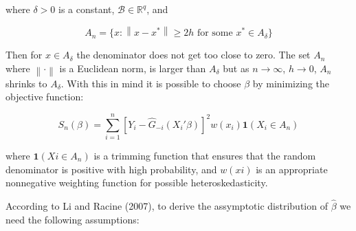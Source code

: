 \documentclass[a4paper]{article}
\newcommand{\norm}[1]{\left\lVert#1\right\rVert}
\begin{document}
where $\delta > 0$ is a constant, $\mathcal{B} \in \mathbb{R}^q$, and

\[ A_n = \{ x : \norm{x - x^*} \geq 2h \text{ for some } x^* \in A_\delta \}
\]

Then for $x \in A_\delta$ the denominator does not get too close to zero. The set $A_n$ where $\norm{\cdot}$ is a Euclidean norm, is larger than $A_\delta$ but as $ n \rightarrow \infty $, $h \rightarrow 0$, $A_n$ shrinks to $A_\delta$. With this in mind it is possible to choose $\beta$ by minimizing the objective function:

\begin{equation}
S_n(\beta) = \sum_{i=1}^{n}  [Y_i - \hat{G}_{-i}(X_i'\beta)]^2w(x_i)\mathbf{1}{(X_i \in A_n)}
\end{equation}

where $\mathbf{1}{(Xi \in A_n)}$ is a trimming function that ensures that the random denominator is positive with high probability, and $w(xi)$ is an appropriate nonnegative weighting function for possible heteroskedasticity.

According to Li and Racine (2007), to derive the assymptotic distribution of $\hat{\beta}$ we need the following assumptions:

\newtheorem{theorem}{Theorem}[section]
\end{document}
